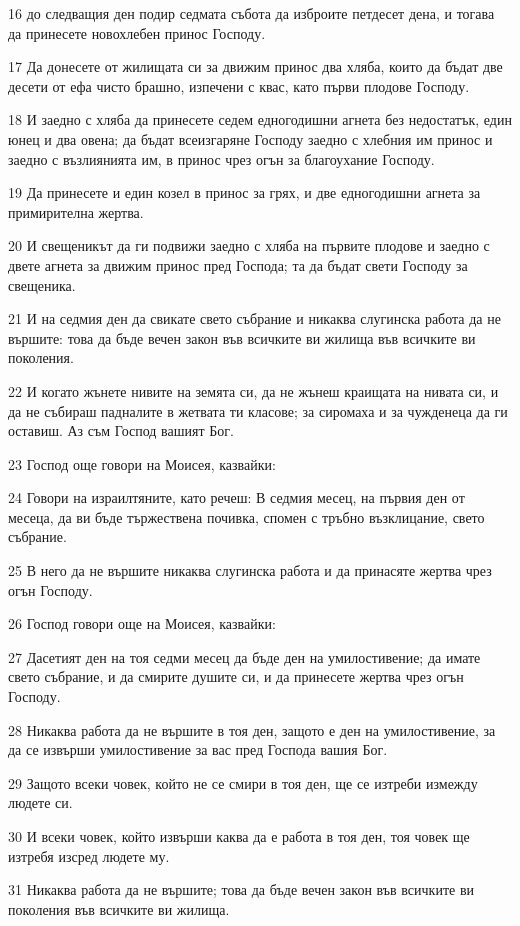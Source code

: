 \par 16 до следващия ден подир седмата събота да изброите петдесет дена, и тогава да принесете новохлебен принос Господу.
\par 17 Да донесете от жилищата си за движим принос два хляба, които да бъдат две десети от ефа чисто брашно, изпечени с квас, като първи плодове Господу.
\par 18 И заедно с хляба да принесете седем едногодишни агнета без недостатък, един юнец и два овена; да бъдат всеизгаряне Господу заедно с хлебния им принос и заедно с възлиянията им, в принос чрез огън за благоухание Господу.
\par 19 Да принесете и един козел в принос за грях, и две едногодишни агнета за примирителна жертва.
\par 20 И свещеникът да ги подвижи заедно с хляба на първите плодове и заедно с двете агнета за движим принос пред Господа; та да бъдат свети Господу за свещеника.
\par 21 И на седмия ден да свикате свето събрание и никаква слугинска работа да не вършите: това да бъде вечен закон във всичките ви жилища във всичките ви поколения.
\par 22 И когато жънете нивите на земята си, да не жънеш краищата на нивата си, и да не събираш падналите в жетвата ти класове; за сиромаха и за чужденеца да ги оставиш. Аз съм Господ вашият Бог.
\par 23 Господ още говори на Моисея, казвайки:
\par 24 Говори на израилтяните, като речеш: В седмия месец, на първия ден от месеца, да ви бъде тържествена почивка, спомен с тръбно възклицание, свето събрание.
\par 25 В него да не вършите никаква слугинска работа и да принасяте жертва чрез огън Господу.
\par 26 Господ говори още на Моисея, казвайки:
\par 27 Дасетият ден на тоя седми месец да бъде ден на умилостивение; да имате свето събрание, и да смирите душите си, и да принесете жертва чрез огън Господу.
\par 28 Никаква работа да не вършите в тоя ден, защото е ден на умилостивение, за да се извърши умилостивение за вас пред Господа вашия Бог.
\par 29 Защото всеки човек, който не се смири в тоя ден, ще се изтреби измежду людете си.
\par 30 И всеки човек, който извърши каква да е работа в тоя ден, тоя човек ще изтребя изсред людете му.
\par 31 Никаква работа да не вършите; това да бъде вечен закон във всичките ви поколения във всичките ви жилища.
